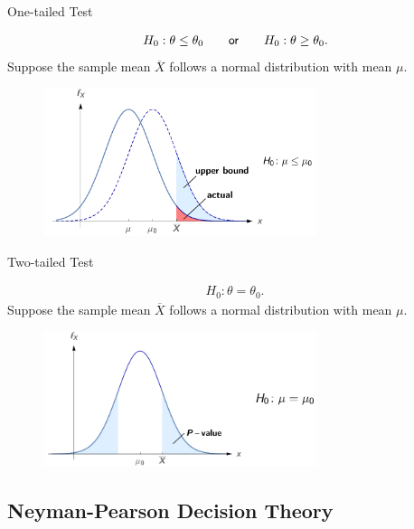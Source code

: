 \begin{frame}{One-tailed Test}

\justifying
{}
\begin{align*}
H_0: \theta \leq \theta_0 \qquad \mathsf{or} \qquad H_0: \theta \geq \theta_0.
\end{align*}
 Suppose the sample mean $\overline{X}$ follows a normal distribution with mean $\mu$.
\begin{figure}[htbp]
	\centering
	\includegraphics[width=8cm]{./images/rc5fig1.png}
\end{figure}

\end{frame}

\begin{frame}{Two-tailed Test}

\justifying
{}
\begin{align*}
H_0: \theta = \theta_0.
\end{align*}
 Suppose the sample mean $\overline{X}$ follows a normal distribution with mean $\mu$.
\begin{figure}[htbp]
	\centering
	\includegraphics[width=8cm]{./images/rc5fig2.png}
\end{figure}

\end{frame}


\subsection{Neyman-Pearson Decision Theory}

